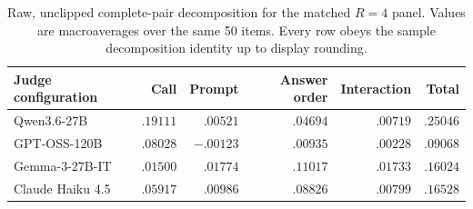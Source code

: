 \begin{table}[t]
\centering
\small
\setlength{\tabcolsep}{5pt}
\begin{tabular}{lrrrrr}
\toprule
Judge configuration & Call & Prompt & Answer order & Interaction & Total \\
\midrule
Qwen3.6-27B & $.19111$ & $.00521$ & $.04694$ & $.00719$ & $.25046$ \\
GPT-OSS-120B & $.08028$ & $-.00123$ & $.00935$ & $.00228$ & $.09068$ \\
Gemma-3-27B-IT & $.01500$ & $.01774$ & $.11017$ & $.01733$ & $.16024$ \\
Claude Haiku 4.5 & $.05917$ & $.00986$ & $.08826$ & $.00799$ & $.16528$ \\
\bottomrule
\end{tabular}
\caption{Raw, unclipped complete-pair decomposition for the matched \(R=4\)
panel. Values are macroaverages over the same 50 items. Every row obeys the
sample decomposition identity up to display rounding.}
\end{table}
